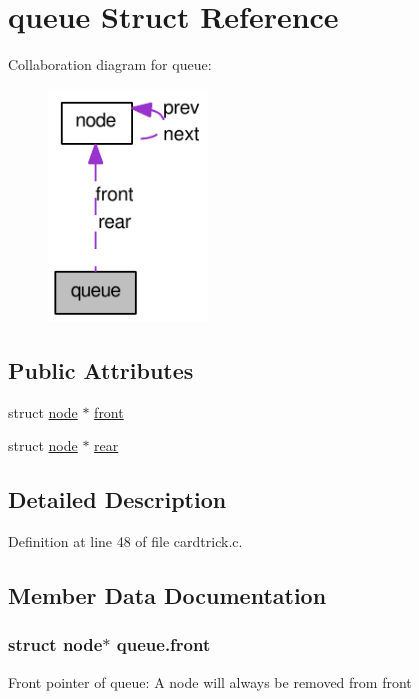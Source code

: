 \hypertarget{structqueue}{
\section{queue Struct Reference}
\label{structqueue}
}


Collaboration diagram for queue:\nopagebreak
\begin{figure}[H]
\begin{center}
\leavevmode
\includegraphics[width=120pt]{structqueue__coll__graph}
\end{center}
\end{figure}
\subsection*{Public Attributes}
\begin{DoxyCompactItemize}
\item 
struct \hyperlink{structnode}{node} $\ast$ \hyperlink{structqueue_a2798de43b9b1439dbbef5dfd7bb78d8e}{front}
\item 
struct \hyperlink{structnode}{node} $\ast$ \hyperlink{structqueue_aa5381eaa02a38f052e2d0fdf59849af3}{rear}
\end{DoxyCompactItemize}


\subsection{Detailed Description}


Definition at line 48 of file cardtrick.c.



\subsection{Member Data Documentation}
\hypertarget{structqueue_a2798de43b9b1439dbbef5dfd7bb78d8e}{
\subsubsection[{front}]{\setlength{\rightskip}{0pt plus 5cm}struct {\bf node}$\ast$ {\bf queue.front}}}
\label{structqueue_a2798de43b9b1439dbbef5dfd7bb78d8e}
Front pointer of queue: A node will always be removed from front 

